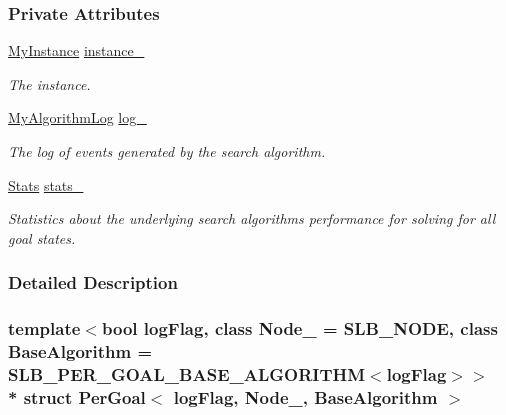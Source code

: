 \subsubsection*{Private Attributes}
\begin{DoxyCompactItemize}
\item 
\hyperlink{structPerGoal_a202c6aec2e84dd9f8cf531ddd385cc78}{My\+Instance} \hyperlink{structPerGoal_add89346d272ec6e5ef058a68bb8f1710}{instance\+\_\+}\hypertarget{structPerGoal_add89346d272ec6e5ef058a68bb8f1710}{}\label{structPerGoal_add89346d272ec6e5ef058a68bb8f1710}

\begin{DoxyCompactList}\small\item\em The instance. \end{DoxyCompactList}\item 
\hyperlink{structPerGoal_ad684cf87592474ca6de1b39cc43a3fb2}{My\+Algorithm\+Log} \hyperlink{structPerGoal_aa0aee2bba4a510a6f4c3e38206a9433e}{log\+\_\+}\hypertarget{structPerGoal_aa0aee2bba4a510a6f4c3e38206a9433e}{}\label{structPerGoal_aa0aee2bba4a510a6f4c3e38206a9433e}

\begin{DoxyCompactList}\small\item\em The log of events generated by the search algorithm. \end{DoxyCompactList}\item 
\hyperlink{structStats}{Stats} \hyperlink{structPerGoal_a5e87e372c37a4d14fe3ade23689dea52}{stats\+\_\+}\hypertarget{structPerGoal_a5e87e372c37a4d14fe3ade23689dea52}{}\label{structPerGoal_a5e87e372c37a4d14fe3ade23689dea52}

\begin{DoxyCompactList}\small\item\em Statistics about the underlying search algorithm\textquotesingle{}s performance for solving for all goal states. \end{DoxyCompactList}\end{DoxyCompactItemize}


\subsubsection{Detailed Description}
\subsubsection*{template$<$bool log\+Flag, class Node\+\_\+ = S\+L\+B\+\_\+\+N\+O\+DE, class Base\+Algorithm = S\+L\+B\+\_\+\+P\+E\+R\+\_\+\+G\+O\+A\+L\+\_\+\+B\+A\+S\+E\+\_\+\+A\+L\+G\+O\+R\+I\+T\+H\+M$<$log\+Flag$>$$>$\\*
struct Per\+Goal$<$ log\+Flag, Node\+\_\+, Base\+Algorithm $>$}

